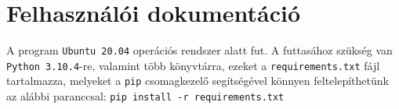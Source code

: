 \chapter{Felhasználói dokumentáció}
\label{ch:user}

A program \texttt{Ubuntu 20.04} operációs rendszer alatt fut. A futtasához szükség van \texttt{Python 3.10.4}-re, valamint több könyvtárra, ezeket a \texttt{requirements.txt} fájl tartalmazza, melyeket a \texttt{pip} csomagkezelő segítségével könnyen feltelepíthetünk az alábbi paranccsal: \texttt{pip install -r requirements.txt}
